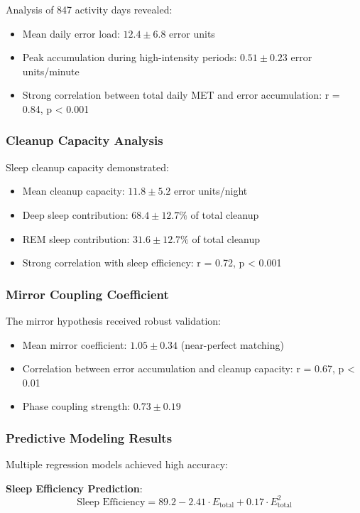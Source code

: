 \documentclass[twocolumn]{article}
\begin{document}
Analysis of 847 activity days revealed:
\begin{itemize}
\item Mean daily error load: $12.4 \pm 6.8$ error units
\item Peak accumulation during high-intensity periods: $0.51 \pm 0.23$ error units/minute
\item Strong correlation between total daily MET and error accumulation: r = 0.84, p < 0.001
\end{itemize}

\subsubsection{Cleanup Capacity Analysis}

Sleep cleanup capacity demonstrated:
\begin{itemize}
\item Mean cleanup capacity: $11.8 \pm 5.2$ error units/night
\item Deep sleep contribution: $68.4 \pm 12.7\%$ of total cleanup
\item REM sleep contribution: $31.6 \pm 12.7\%$ of total cleanup
\item Strong correlation with sleep efficiency: r = 0.72, p < 0.001
\end{itemize}

\subsubsection{Mirror Coupling Coefficient}

The mirror hypothesis received robust validation:
\begin{itemize}
\item Mean mirror coefficient: $1.05 \pm 0.34$ (near-perfect matching)
\item Correlation between error accumulation and cleanup capacity: r = 0.67, p < 0.01
\item Phase coupling strength: $0.73 \pm 0.19$
\end{itemize}

\subsubsection{Predictive Modeling Results}

Multiple regression models achieved high accuracy:

\textbf{Sleep Efficiency Prediction}:
\begin{equation}
\text{Sleep Efficiency} = 89.2 - 2.41 \cdot E_{\text{total}} + 0.17 \cdot E_{\text{total}}^2
\end{equation}
\end{document}
